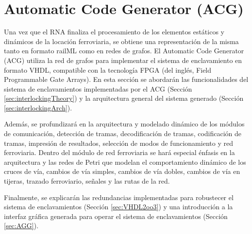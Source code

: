 \chapter{Automatic Code Generator (ACG)}
\label{sec:ACG}
    
    Una vez que el RNA finaliza el procesamiento de los elementos estáticos y dinámicos de la locación ferroviaria, se obtiene una representación de la misma tanto en formato railML como en redes de grafos. El Automatic Code Generator (ACG) utiliza la red de grafos para implementar el sistema de enclavamiento en formato VHDL, compatible con la tecnología FPGA (del inglés, Field Programmable Gate Arrays). En esta sección se abordarán las funcionalidades del sistema de enclavamientos implementadas por el ACG (Sección \ref{sec:interlockingTheory}) y la arquitectura general del sistema generado (Sección \ref{sec:interlockingArch}). 
    
    
    Además, se profundizará en la arquitectura y modelado dinámico de los módulos de comunicación, detección de tramas, decodificación de tramas, codificación de tramas, impresión de resultados, selección de modos de funcionamiento y red ferroviaria. Dentro del módulo de red ferroviaria se hará especial énfasis en la arquitectura y las redes de Petri que modelan el comportamiento dinámico de los cruces de vía, cambios de vía simples, cambios de vía dobles, cambios de vía en tijeras, trazado ferroviario, señales y las rutas de la red.
    
    Finalmente, se explicarán las redundancias implementadas para robustecer el sistema de enclavamientos (Sección \ref{sec:VHDL2oo3}) y una introducción a la interfaz gráfica generada para operar el sistema de enclavamientos (Sección \ref{sec:AGG}).
    
     
        
    